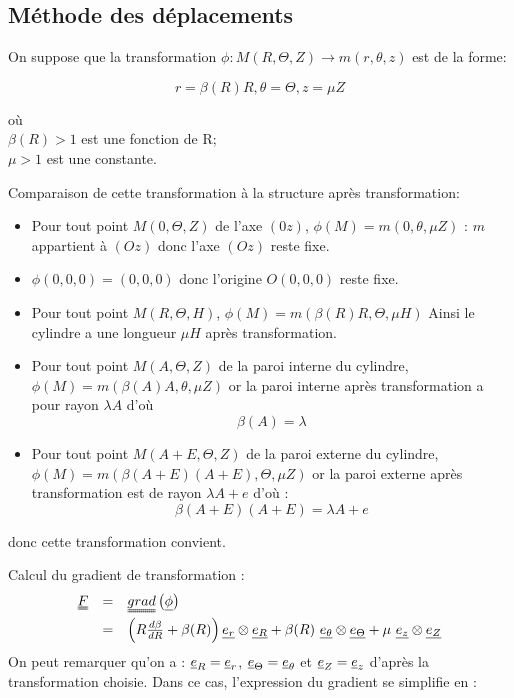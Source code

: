 \documentclass[a4paper,11pt]{article}
\newcommand{\tens}{\uuline}
\begin{document}
\subsection{Méthode des déplacements}
On suppose que la transformation $\phi : M(R,\Theta, Z) \rightarrow m(r, \theta, z)$ est de la forme:

$$r=\beta(R)R, \theta=\Theta, z=\mu Z$$

\begin{flushleft}
où\\
$\beta(R)>1$ est une fonction de R;\\
$\mu>1$ est une constante.
\end{flushleft}

Comparaison de cette transformation à la structure après transformation:
\begin{itemize}
\item Pour tout point $M(0, \Theta, Z)$ de l'axe $(0z)$, $\phi(M) = m(0, \theta, \mu Z)$ : $m$ appartient à $(Oz)$ donc l'axe $(Oz)$ reste fixe.
\item $\phi (0, 0, 0) = (0, 0, 0)$ donc l'origine $O(0, 0, 0)$ reste fixe.
\item Pour tout point $M(R, \Theta, H)$,  $\phi(M) = m(\beta (R) R, \Theta, \mu H)$ Ainsi le cylindre a une longueur $\mu H$ après transformation.
\item Pour tout point $M(A, \Theta, Z)$ de la paroi interne du cylindre, $\phi(M) = m(\beta(A) A, \theta, \mu Z)$ or la paroi interne après transformation a pour rayon $\lambda A$ d'où 
\begin{equation}
\beta(A) = \lambda
\label{eq:condition_limite_beta}
\end{equation}
\item Pour tout point $M(A+E, \Theta, Z)$ de la paroi externe du cylindre, $\phi(M) = m(\beta(A+E) (A+E), \Theta, \mu Z)$ or la paroi externe après transformation est de rayon $\lambda A + e$ d'où :
$$\beta(A+E)(A+E) = \lambda A+ e$$
\end{itemize}
donc cette transformation convient.

Calcul du gradient de transformation :
$$
\begin{array}{rcl}
\tens{F} &=& \tens{grad} \left(\uline{\phi}\right)\\
&=& \left(R\frac{d\beta}{dR} +\beta(R)\right) \uline{e_r}\otimes \uline{e_R} + \beta(R)\ \uline{e_\theta}\otimes \uline{e_\Theta} + \mu\ \uline{e_z}\otimes \uline{e_Z}
\end{array}
$$
On peut remarquer qu'on a : $\uline{e}_{R} = \uline{e}_{r}$, $\uline{e}_{\Theta} = \uline{e}_{\theta}$ et $\uline{e}_{Z} = \uline{e}_{z}$ d'après la transformation choisie. Dans ce cas, l'expression du gradient se simplifie en :
\end{document}

